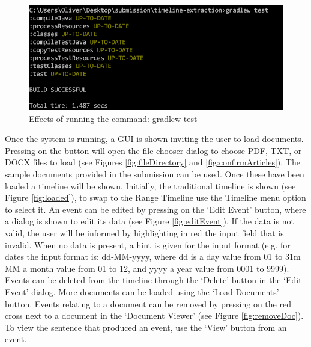 \begin{figure}[H]
\caption{Effects of running the command: gradlew test}
\label{fig:gradlewTest}
\includegraphics{gradlewTest.PNG}
\centering
\end{figure}

\par Once the system is running, a GUI is shown inviting the user to load documents. Pressing on the button will open the file chooser dialog to choose PDF, TXT, or DOCX files to load (see Figures \ref{fig:fileDirectory} and \ref{fig:confirmArticles}). The sample documents provided in the submission can be used. Once these have been loaded a timeline will be shown. Initially, the traditional timeline is shown (see Figure \ref{fig:loaded}), to swap to the Range Timeline use the Timeline menu option to select it. An event can be edited by pressing on the `Edit Event' button, where a dialog is shown to edit its data (see Figure \ref{fig:editEvent}). If the data is not valid, the user will be informed by highlighting in red the input field that is invalid. When no data is present, a hint is given for the input format (e.g. for dates the input format is: dd-MM-yyyy, where dd is a day value from 01 to 31m MM a month value from 01 to 12, and yyyy a year value from 0001 to 9999). Events can be deleted from the timeline through the `Delete' button in the `Edit Event' dialog. More documents can be loaded using the `Load Documents' button. Events relating to a document can be removed by pressing on the red cross next to a document in the `Document Viewer' (see Figure \ref{fig:removeDoc}). To view the sentence that produced an event, use the `View' button from an event.

